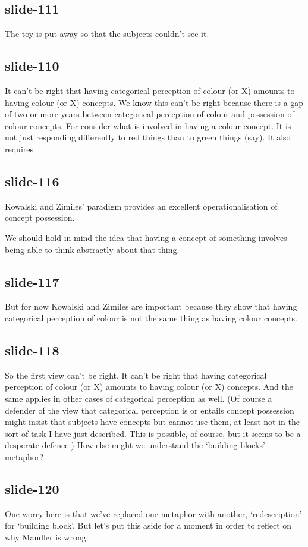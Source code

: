 \documentclass[12pt,\papersize]{extarticle}
\begin{document}
\subsection{slide-111}
The toy is put away so that the subjects couldn't see it.

\subsection{slide-110}
It can't be right that having categorical perception of colour (or X) amounts to having colour (or X) concepts.
We know this can't be right because there is a gap of two or more years between categorical perception of colour and possession of colour concepts.
For consider what is involved in having a colour concept.
It is not just responding differently to red things than to green things (say).
It also requires

\subsection{slide-116}
Kowalski and Zimiles' paradigm provides an excellent operationalisation of concept possession.

We should hold in mind the idea that having a concept of something involves being able to think abstractly about that thing.

\subsection{slide-117}
But for now Kowalski and Zimiles are important because they show that having categorical perception of colour is not the same thing as having colour concepts.

\subsection{slide-118}
So the first view can't be right.
It can't be right that having categorical perception of colour (or X) amounts to having colour (or X) concepts.
And the same applies in other cases of categorical perception as well.
(Of course a defender of the view that categorical perception is or entails concept possession might insist that subjects have concepts but cannot use them,
at least not in the sort of task I have just described. This is possible, of course, but it seems to be a desperate defence.)
How else might we understand the ‘building blocks’ metaphor?

\subsection{slide-120}
One worry here is that we've replaced one metaphor with another, ‘redescription’ for ‘building block’.
But let's put this aside for a moment in order to reflect on why Mandler is wrong.
\end{document}
